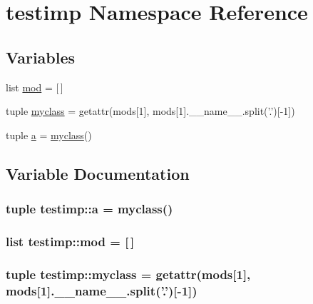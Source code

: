 \hypertarget{namespacetestimp}{\section{testimp \-Namespace \-Reference}
\label{namespacetestimp}
}
\subsection*{\-Variables}
\begin{DoxyCompactItemize}
\item 
list \hyperlink{namespacetestimp_a0e3bc94b5ceda4ee9ce5e6f9f5a4c614}{mod} = \mbox{[}$\,$\mbox{]}
\item 
tuple \hyperlink{namespacetestimp_a74ea8c714e102893d6ba657b016bfce6}{myclass} = getattr(mods\mbox{[}1\mbox{]}, mods\mbox{[}1\mbox{]}.\-\_\-\-\_\-name\-\_\-\-\_\-.\-split('.')\mbox{[}-\/1\mbox{]})
\item 
tuple \hyperlink{namespacetestimp_ab1188568afaabbd8c2cb38e53701aae9}{a} = \hyperlink{namespacetestimp_a74ea8c714e102893d6ba657b016bfce6}{myclass}()
\end{DoxyCompactItemize}


\subsection{\-Variable \-Documentation}
\hypertarget{namespacetestimp_ab1188568afaabbd8c2cb38e53701aae9}{
\subsubsection[{a}]{\setlength{\rightskip}{0pt plus 5cm}tuple {\bf testimp\-::a} = {\bf myclass}()}}\label{namespacetestimp_ab1188568afaabbd8c2cb38e53701aae9}
\hypertarget{namespacetestimp_a0e3bc94b5ceda4ee9ce5e6f9f5a4c614}{
\subsubsection[{mod}]{\setlength{\rightskip}{0pt plus 5cm}list {\bf testimp\-::mod} = \mbox{[}$\,$\mbox{]}}}\label{namespacetestimp_a0e3bc94b5ceda4ee9ce5e6f9f5a4c614}
\hypertarget{namespacetestimp_a74ea8c714e102893d6ba657b016bfce6}{
\subsubsection[{myclass}]{\setlength{\rightskip}{0pt plus 5cm}tuple {\bf testimp\-::myclass} = getattr(mods\mbox{[}1\mbox{]}, mods\mbox{[}1\mbox{]}.\-\_\-\-\_\-name\-\_\-\-\_\-.\-split('.')\mbox{[}-\/1\mbox{]})}}\label{namespacetestimp_a74ea8c714e102893d6ba657b016bfce6}

